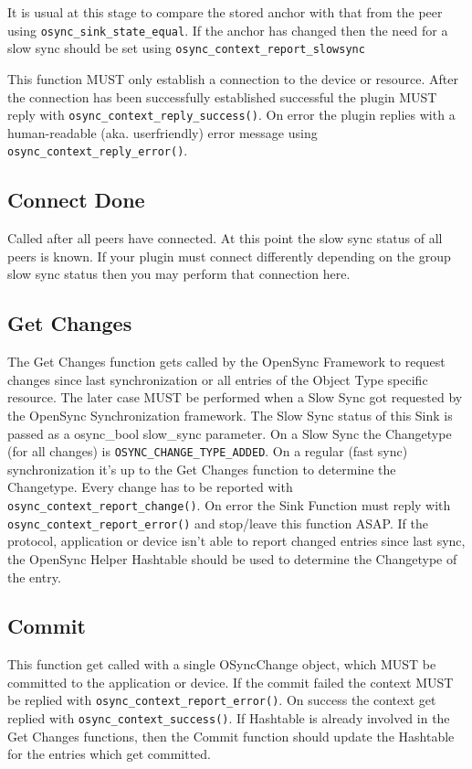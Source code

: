It is usual at this stage to compare the stored anchor with that from the peer
using \verb|osync_sink_state_equal|.  If the anchor has changed then the need for
a slow sync should be set using \verb|osync_context_report_slowsync|

This function MUST only establish a connection to the device or resource. After
the connection has been successfully established successful the plugin MUST
reply with \verb|osync_context_reply_success()|. On error the plugin replies
with a human-readable (aka. userfriendly) error message using
\verb|osync_context_reply_error()|.
\subsection{Connect Done}
Called after all peers have connected.  At this point the slow sync status of
all peers is known.  If your plugin must connect differently depending on the
group slow sync status then you may perform that connection here.
\subsection{Get Changes}
The Get Changes function gets called by the OpenSync Framework to request changes
since last synchronization or all entries of the Object Type specific resource.
The later case MUST be performed when a Slow Sync got requested by the OpenSync
Synchronization framework. The Slow Sync status of this Sink is passed as a osync_bool
slow_sync parameter. On a Slow Sync the 
Changetype (for all changes) is \verb|OSYNC_CHANGE_TYPE_ADDED|. On a regular 
(fast sync) synchronization it's up to the Get Changes function to determine 
the Changetype. Every change has to be reported with 
\verb|osync_context_report_change()|. On error the Sink Function must
reply with \verb|osync_context_report_error()| and stop/leave this 
function ASAP. If the protocol, application or device isn't able to report 
changed entries since last sync, the OpenSync Helper Hashtable should be used 
to determine the Changetype of the entry.
\subsection{Commit}
This function get called with a single OSyncChange object, which MUST be
committed to the application or device. If the commit failed the context MUST be
replied with \verb|osync_context_report_error()|. On success the context get
replied with \verb|osync_context_success()|. If Hashtable is already involved in
the Get Changes functions, then the Commit function should update the Hashtable
for the entries which get committed.

